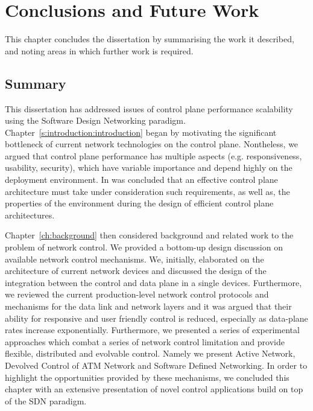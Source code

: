 \def\baselinestretch{1}
\chapter{Conclusions and Future Work} \label{sec:conclusions}
\ifpdf
    \graphicspath{{Conclusions/ConclusionsFigs/PNG/}{Conclusions/ConclusionsFigs/PDF/}{Conclusions/ConclusionsFigs/}}
\else
    \graphicspath{{Conclusions/ConclusionsFigs/EPS/}{Conclusions/ConclusionsFigs/}}
\fi

\def\baselinestretch{1.66}

This chapter concludes the dissertation by summarising the work it described,
and noting areas in which further work is required.

\section{Summary}

This dissertation has addressed issues of control plane performance scalability
using the Software Design Networking paradigm.
Chapter~\ref{s:introduction:introduction} began by motivating the significant
bottleneck of current network technologies on the control plane. Nontheless, we
argued that control plane performance has multiple aspects (e.g. responsiveness,
usability, security), which have variable importance and depend highly on the
deployment environment. In was concluded that an effective control plane
architecture must take under consideration such requirements, as well as, the
properties of the environment during the design of efficient control plane
architectures. 

Chapter~\ref{ch:background} then considered background and related work to the problem of network
control. We provided a bottom-up design discussion on available network control
mechanisms. We, initially, elaborated on the architecture of current network
devices and discussed the design of the integration between the control and data
plane in a single devices. Furthermore, we reviewed the current production-level
network control protocols and mechanisms for the data link and network layers
and it was argued that their ability for responsive and user friendly control is
reduced, especially as data-plane rates increase exponentially. Furthermore, we
presented a series of experimental approaches which combat a series of network
control limitation and provide flexible, distributed and evolvable control.
Namely we present Active Network, Devolved Control of ATM Network and Software
Defined Networking. In order to highlight the opportunities provided by these
mechanisms, we concluded this chapter with an extensive presentation of novel
control applications build on top of the SDN paradigm. 

